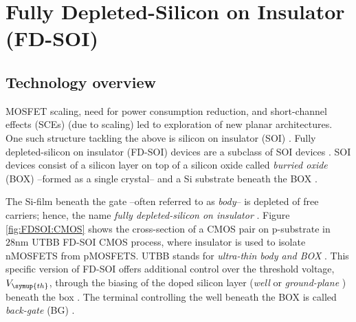 \section{Fully Depleted-Silicon on Insulator (FD-SOI)}\label{section:FDSOI}

	\subsection{Technology overview}
		MOSFET scaling, need for power consumption reduction, and short-channel effects (SCEs) (due to scaling) led to exploration of new planar architectures. One such structure tackling the above is silicon on insulator (SOI) \cite{Fossum_Trivedi_2013}\cite{FDSOICMOS}. Fully depleted-silicon on insulator (FD-SOI) devices are a subclass of SOI devices \cite{Fossum_Trivedi_2013}\cite{FDSOICMOS}. SOI devices consist of a silicon layer on top of a silicon oxide called \textsl{burried oxide} (BOX) --formed as a single crystal-- and a Si substrate beneath the BOX \cite{FDSOICMOS}.\par

		The Si-film beneath the gate --often referred to as \textsl{body}-- is depleted of free carriers; hence, the name \textsl{fully depleted-silicon on insulator} \cite{Fossum_Trivedi_2013}\cite{FDSOICMOS}\cite{NYSSENS202433}. Figure \ref{fig:FDSOI:CMOS} shows the cross-section of a CMOS pair on p-substrate in $28\unit{\nano\meter}$ UTBB FD-SOI CMOS process, where insulator is used to isolate nMOSFETS from pMOSFETS. UTBB stands for \textsl{ultra-thin body and BOX} \cite{NYSSENS202433}. This specific version of FD-SOI offers additional control over the threshold voltage, $V_{\symup{th}}$, through the biasing of the doped silicon layer (\textsl{well} \cite{7469814} or \textsl{ground-plane} \cite{nazarov_functional_2014}) beneath the box \cite{NYSSENS202433}. The terminal controlling the well beneath the BOX is called \textsl{back-gate} (BG) \cite{NYSSENS202433}.\par

